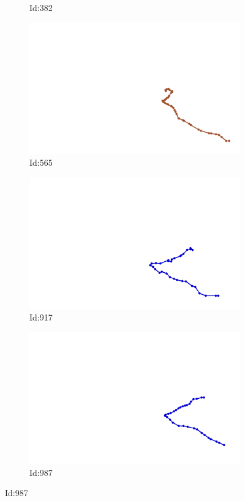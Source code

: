 \documentclass[12pt,twoside]{report}
\begin{document}
\begin{figure}
\begin{subfigure}[b]{0.20\textwidth}
\caption{Id:382}
\end{subfigure}
\begin{subfigure}[b]{0.20\textwidth}
\centering
\includegraphics[width=\textwidth]{../../trajectories/565.png}
\caption{Id:565}
\end{subfigure}
\begin{subfigure}[b]{0.20\textwidth}
\centering
\includegraphics[width=\textwidth]{../../trajectories/917.png}
\caption{Id:917}
\end{subfigure}
\begin{subfigure}[b]{0.20\textwidth}
\centering
\includegraphics[width=\textwidth]{../../trajectories/987.png}
\caption{Id:987}
\end{subfigure}
\end{figure}
\end{document}
